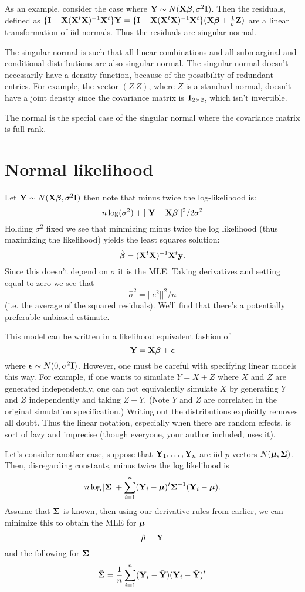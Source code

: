As an example, consider the case where $\mathbf{Y} \sim N(\mathbf{X} \boldsymbol{\beta}, \sigma^2 \mathbf{I})$.
Then the residuals, defined as $\{\mathbf{I} - \mathbf{X} (\mathbf{X}^t \mathbf{X})^{-1} \mathbf{X}^t\} \mathbf{Y} = \{\mathbf{I} - \mathbf{X} (\mathbf{X}^t \mathbf{X})^{-1} \mathbf{X}^t\}(\mathbf{X}\boldsymbol{\beta} + \frac{1}{\sigma} \mathbf{Z})$
are a linear transformation of iid normals. Thus the residuals are singular normal. 

The singular normal is such that all linear combinations and all submarginal and conditional distributions
are also singular normal. The singular normal doesn't necessarily
have a density function, because of the possibility of redundant
entries. For example, the vector $(Z ~ Z)$, where $Z$ is a standard normal,
doesn't have a joint density since the covariance matrix is $\mathbf{1}_{2\times 2}$,
which isn't invertible.

The normal is the special case of the singular normal where the covariance
matrix is full rank. 

\section{Normal likelihood}

Let $\mathbf{Y} \sim N(\mathbf{X} \boldsymbol{\beta}, \sigma^2 \mathbf{I})$ then note that 
minus twice the log-likelihood is:
$$
n\log(\sigma^2) + ||\mathbf{Y} - \mathbf{X} \boldsymbol{\beta}||^2 / 2\sigma^2
$$
Holding $\sigma^2$ fixed we see that minmizing minus twice
the log likelihood (thus maximizing the likelihood) yields
the least squares solution:
$$
\hat {\boldsymbol{\beta}} = (\mathbf{X}^t \mathbf{X})^{-1} \mathbf{X}^t \mathbf{y}.
$$
Since this doesn't depend on $\sigma$ it is the MLE. 
Taking derivatives and setting equal to zero we
see that 
$$
\hat \sigma^2 = ||e^2||^2 / n
$$
(i.e. the average of the squared residuals). We'll
find that there's a potentially preferable unbiased
estimate. 

This model can be written in a  likelihood equivalent fashion
of  
$$
\mathbf{Y} = \mathbf{X} \boldsymbol{\beta} + \boldsymbol{\epsilon}
$$
where $\boldsymbol{\epsilon} \sim N(0, \sigma^2 \mathbf{I})$. However, one
must be careful with specifying linear models this way.
For example, if one wants to simulate $Y = X + Z$ where $X$ and $Z$ are generated
independently, one can not equivalently simulate $X$
by generating $Y$ and $Z$ independently and taking $Z - Y$.
(Note $Y$ and $Z$ are correlated in the original simulation specification.)
Writing out the distributions explicitly removes all doubt. 
Thus the linear notation, especially when there are random effects, is sort
of lazy and imprecise (though everyone, your author included, uses it). 


Let's consider another case, suppose that $\mathbf{Y}_1, \ldots, \mathbf{Y}_n$ are iid $p$ vectors
$N(\boldsymbol{\mu}, \boldsymbol{\Sigma})$. Then, disregarding constants, minus twice the log likelihood is
$$
n \log|\boldsymbol{\Sigma}| + \sum_{i=1}^n (\mathbf{Y}_i - \boldsymbol{\mu})^t \boldsymbol{\Sigma}^{-1} (\mathbf{Y}_i - \boldsymbol{\mu}).
$$
Assume that $\boldsymbol{\Sigma}$ is known, then using our derivative rules from earlier,
we can minimize this to obtain the MLE for $\boldsymbol{\mu}$
$$
\hat \mu = \bar {\mathbf{Y}} 
$$
and the following for $\boldsymbol{\Sigma}$
$$
\hat {\boldsymbol{\Sigma}} = \frac{1}{n} \sum_{i=1}^n (\mathbf{Y}_i - \bar {\mathbf{Y}}) (\mathbf{Y}_i -\bar {\mathbf{Y}})^t
$$

